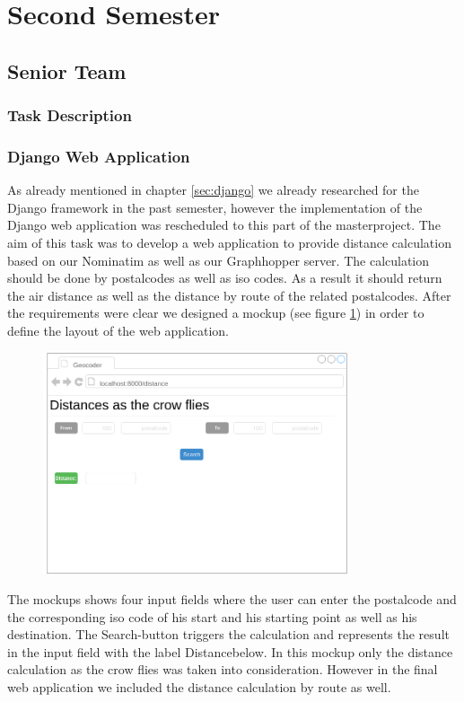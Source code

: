 \documentclass[12pt]{article}
\begin{document}
\section{Second Semester}
\subsection{Senior Team}
\subsubsection{Task Description}
\subsubsection{Django Web Application}
As already mentioned in chapter \ref{sec:django} we already researched for the Django framework in the past semester, however the implementation of the Django web application was rescheduled to this part of the masterproject.
The aim of this task was to develop a web application to provide distance calculation based on our Nominatim as well as our Graphhopper server. The calculation should be done by postalcodes as well as iso codes. As a result it should return the air distance as well as the distance by route of the related postalcodes. After the requirements were clear we designed a mockup (see figure \ref{fig:mockup}) in order to define the layout of the web application. 
\begin{figure}[H]
\centering
\includegraphics[width=0.8\textwidth]{img/mockup}
\label{fig:mockup}
\end{figure}
The mockups shows four input fields where the user can enter the postalcode and the corresponding iso code of his start and his starting point as well as his destination. The \glqq Search\grqq-button triggers the calculation and represents the result in the input field with the label \glqq Distance\grqq below. In this mockup only the distance calculation as the crow flies was taken into consideration. However in the final web application we included the distance calculation by route as well.\\
\end{document}
